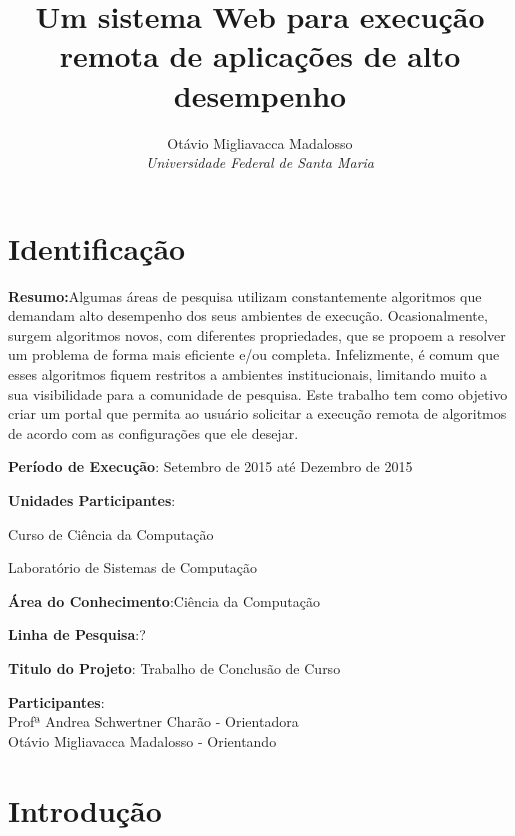 \documentclass[12pt]{article}
\title{Um sistema Web para execução remota de aplicações de alto desempenho}
\author{Otávio Migliavacca Madalosso \\ \emph{Universidade Federal de Santa Maria}}
\begin{document}
\maketitle


\section{Identificação}

\begin{description} \itemsep 0pt

\item{\textbf{Resumo:}}Algumas áreas de pesquisa utilizam constantemente algoritmos que demandam alto desempenho dos seus ambientes de execução. Ocasionalmente, surgem algoritmos novos, com diferentes propriedades, que se propoem a resolver um problema de forma mais eficiente e/ou completa. Infelizmente, é comum que esses algoritmos fiquem restritos a ambientes institucionais, limitando muito a sua visibilidade para a comunidade de pesquisa. Este trabalho tem como objetivo criar um portal que permita ao usuário solicitar a execução remota de algoritmos de acordo com as configurações que ele desejar.


\item{\textbf{Período de Execução}}: Setembro de 2015 até Dezembro de 2015

\item{\textbf{Unidades Participantes}}: 

    Curso de Ciência da Computação
    
    Laboratório de Sistemas de Computação
    
    
\item{\textbf{Área do Conhecimento}}:Ciência da Computação

\item{\textbf{Linha de Pesquisa}}:?

\item{\textbf{Titulo do Projeto}}: Trabalho de Conclusão de Curso

\item{\textbf{Participantes}}:
\\Profª Andrea Schwertner Charão - Orientadora
\\Otávio Migliavacca Madalosso - Orientando
\\ 
\end{description}


\section{Introdução}
\end{document}
